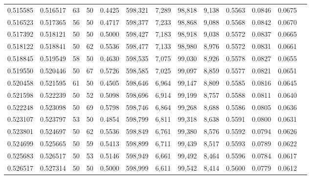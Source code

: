 \begin{tabular}{rrrrrrrrrrrrr}
0.515585 & 0.516517 &    63 &  50 &                                     0.4425 & 598,321 &   7,289 &  98,818 &   9,138 & 0.5563 & 0.0846 & 0.0675 \\
0.516523 & 0.517365 &    56 &  50 &                                     0.4717 & 598,377 &   7,233 &  98,868 &   9,088 & 0.5568 & 0.0842 & 0.0670 \\
0.517392 & 0.518121 &    50 &  50 &                                     0.5000 & 598,427 &   7,183 &  98,918 &   9,038 & 0.5572 & 0.0837 & 0.0665 \\
0.518122 & 0.518841 &    50 &  62 &                                     0.5536 & 598,477 &   7,133 &  98,980 &   8,976 & 0.5572 & 0.0831 & 0.0661 \\
0.518845 & 0.519549 &    58 &  50 &                                     0.4630 & 598,535 &   7,075 &  99,030 &   8,926 & 0.5578 & 0.0827 & 0.0655 \\
0.519550 & 0.520446 &    50 &  67 &                                     0.5726 & 598,585 &   7,025 &  99,097 &   8,859 & 0.5577 & 0.0821 & 0.0651 \\
0.520458 & 0.521595 &    61 &  50 &                                     0.4505 & 598,646 &   6,964 &  99,147 &   8,809 & 0.5585 & 0.0816 & 0.0645 \\
0.521598 & 0.522239 &    50 &  52 &                                     0.5098 & 598,696 &   6,914 &  99,199 &   8,757 & 0.5588 & 0.0811 & 0.0640 \\
0.522248 & 0.523098 &    50 &  69 &                                     0.5798 & 598,746 &   6,864 &  99,268 &   8,688 & 0.5586 & 0.0805 & 0.0636 \\
0.523107 & 0.523797 &    53 &  50 &                                     0.4854 & 598,799 &   6,811 &  99,318 &   8,638 & 0.5591 & 0.0800 & 0.0631 \\
0.523801 & 0.524697 &    50 &  62 &                                     0.5536 & 598,849 &   6,761 &  99,380 &   8,576 & 0.5592 & 0.0794 & 0.0626 \\
0.524699 & 0.525665 &    50 &  59 &                                     0.5413 & 598,899 &   6,711 &  99,439 &   8,517 & 0.5593 & 0.0789 & 0.0622 \\
0.525683 & 0.526517 &    50 &  53 &                                     0.5146 & 598,949 &   6,661 &  99,492 &   8,464 & 0.5596 & 0.0784 & 0.0617 \\
0.526517 & 0.527314 &    50 &  50 &                                     0.5000 & 598,999 &   6,611 &  99,542 &   8,414 & 0.5600 & 0.0779 & 0.0612 \\

\end{tabular}
